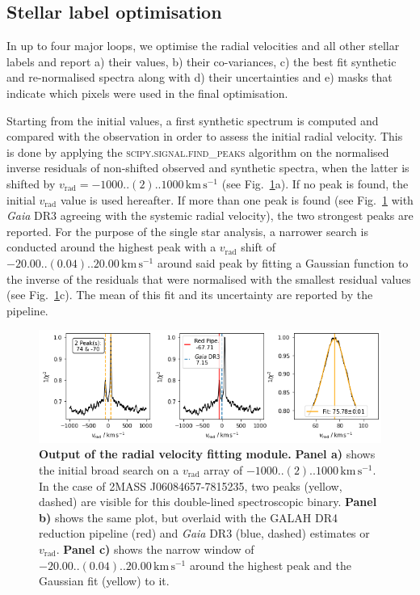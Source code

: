 \documentclass[
  journal=pasa,
  manuscript=research-paper, %
  year=2023,
  volume=37
]{cup-journal}
\newcommand{\vrad}{$v_\mathrm{rad}$\xspace}
\newcommand{\Gaia}{\textit{Gaia}\xspace}
\newcommand{\kms}{\,\mathrm{km\,s^{-1}}}	%
\begin{document}
\subsection{Stellar label optimisation}
\label{sec:stellar_label_optimisation}

In up to four major loops, we optimise the radial velocities and all other stellar labels and report a) their values, b) their co-variances, c) the best fit synthetic and re-normalised spectra along with d) their uncertainties and e) masks that indicate which pixels were used in the final optimisation.

Starting from the initial values, a first synthetic spectrum is computed and compared with the observation in order to assess the initial radial velocity. This is done by applying the \textsc{scipy.signal.find\_peaks} algorithm on the normalised inverse residuals of non-shifted observed and synthetic spectra, when the latter is shifted by $v_\text{rad} = -1000..(2)..1000\kms$ (see Fig.~\ref{fig:181221003101356_single_fit_rv}a). If no peak is found, the initial \vrad value is used hereafter. If more than one peak is found (see Fig.~\ref{fig:181221003101356_single_fit_rv} with \Gaia DR3 agreeing with the systemic radial velocity), the two strongest peaks are reported. For the purpose of the single star analysis, a narrower search is conducted around the highest peak with a \vrad shift of $-20.00..(0.04)..20.00\kms$ around said peak by fitting a Gaussian function to the inverse of the residuals that were normalised with the smallest residual values (see Fig.~\ref{fig:181221003101356_single_fit_rv}c). The mean of this fit and its uncertainty are reported by the pipeline.

\begin{figure}[hbt]
\centering
\includegraphics[width=\textwidth]{figures/181221003101356_single_fit_rv.png}
\caption{\textbf{Output of the radial velocity fitting module.} \textbf{Panel a)} shows the initial broad search on a \vrad array of $-1000..(2)..1000\kms$. In the case of 2MASS J06084657-7815235, two peaks (yellow, dashed) are visible for this double-lined spectroscopic binary. \textbf{Panel b)} shows the same plot, but overlaid with the GALAH DR4 reduction pipeline (red) and \Gaia DR3 (blue, dashed) estimates or \vrad. \textbf{Panel c)} shows the narrow window of $-20.00..(0.04)..20.00\kms$ around the highest peak and the Gaussian fit (yellow) to it.}
\label{fig:181221003101356_single_fit_rv}
\end{figure}
\end{document}

